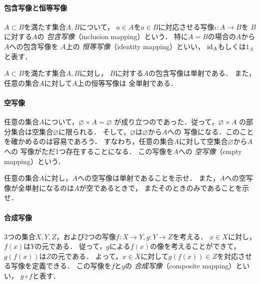    \paragraph{包含写像と恒等写像}
    $A \subset B$を満たす集合$A,  B$について，
    $a \in A$を$a \in B$に対応させる写像$\iota : A \longrightarrow B$を
    $B$に対する$A$の
    \emph{包含写像}（inclusion mapping）という．
    特に$A=B$の場合の$A$から$A$への包含写像を
    $A$上の
    \emph{恒等写像}（identity mapping）といい，
    $\mathop{\mathrm{id}}\nolimits_A$もしくは$1_A$と表す．

    $A \subset B$を満たす集合$A,  B$に対し，
    $B$に対する$A$の包含写像は単射である．
    また，任意の集合$A$に対して$A$上の恒等写像は
    全単射である．

   \paragraph{空写像}
    任意の集合$A$について，$ \varnothing \times A = \varnothing$
    が成り立つのであった．従って，$ \varnothing \times A$
    の部分集合は空集合$\varnothing$に限られる．
    そして，$\varnothing$は$\varnothing$から$A$への
    写像になる．このことを確かめるのは容易であろう．
    すなわち，任意の集合$A$に対して空集合$\varnothing$から$A$への
    写像がただ1つ存在することになる．
    この写像を$A$への
    \emph{空写像}（empty mapping）という．

    \begin{que} \label{que:emptymapping}
      任意の集合$A$に対し，$A$への空写像は単射であることを示せ．
      また，$A$への空写像が全単射になるのは$A$が空であるときで，
      またそのときのみであることを示せ．
    \end{que}
    

   \paragraph{合成写像}
    3つの集合$X,  Y,  Z$，および2つの写像$f: X \longrightarrow Y,  
    g: Y \longrightarrow Z$を考える．
    $x \in X$に対し，$f(x)$は$Y$の元である．
    従って，$g$による$f(x)$の像を考えることができて，
    $g(f(x))$は$Z$の元である．
    よって，$x \in X$に対して$g(f(x)) \in Z$を対応させる写像を定義できる．
    この写像を$f$と$g$の
    \emph{合成写像}（composite mapping）といい，
    $g \circ f$と表す．

